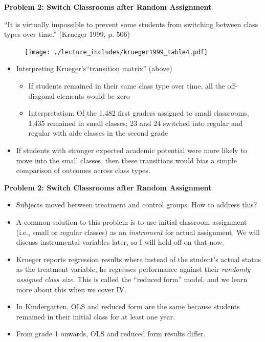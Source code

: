\documentclass{beamer}
\begin{document}
\begin{frame}[plain]
	\begin{center}
	\textbf{Problem 2: Switch Classrooms after Random Assignment}
	\end{center}

``It is virtually impossible to prevent some students from switching between class types over time.'' (Krueger 1999, p. 506)
	\begin{figure}
	\texttt{[image: ./lecture\_includes/krueger1999\_table4.pdf]}
	\end{figure}

	\begin{itemize}
	\item Interpreting Krueger's``transition matrix'' (above) 
		\begin{itemize}
		\item If students remained in their same class type over time, all the off-diagonal elements would be zero
		\item Interpretation: Of the 1,482 first graders assigned to small classrooms, 1,435 remained in small classes; 23 and 24 switched into regular and regular with aide classes in the second grade
		\end{itemize}
	\item If students with stronger expected academic potential were more likely to move into the small classes, then these transitions would bias a simple comparison of outcomes across class types.
	\end{itemize}
\end{frame}

\begin{frame}[plain]
	\begin{center}
	\textbf{Problem 2: Switch Classrooms after Random Assignment}
	\end{center}

	\begin{itemize}
	\item Subjects moved between treatment and control groups.  How to address this?
	\item A common solution to this problem is to use initial classroom assignment (i.e., small or regular classes) as an \emph{instrument} for actual assignment.  We will discuss instrumental variables later, so I will hold off on that now.
	\item Krueger reports regression results where instead of the student's actual status as the treatment variable, he regresses performance against their \emph{randomly assigned class size}.  This is called the ``reduced form'' model, and we learn more about this when we cover IV.
	\item In Kindergarten, OLS and reduced form are the same because students remained in their initial class for at least one year.
	\item From grade 1 onwards, OLS and reduced form results differ.
	\end{itemize}
\end{frame}
\end{document}

